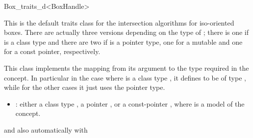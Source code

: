 
\begin{ccRefClass}{Box_traits_d<BoxHandle>}

\ccDefinition

This is the default traits class for the intersection algorithms for
iso-oriented boxes. There are actually three versions depending on the
type of ; there is one if  is a class type and there are
two if  is a pointer type, one for a mutable and one for a const
pointer, respectively.

This class implements the mapping from its  argument to
the  type required in the
 concept. In particular in the case where
 is a class type , it defines
 to be of type , while for the other
cases it just uses the pointer type.

\begin{itemize}
  \item
    : either a class type , a pointer , or a
    const-pointer , where  is a model of the
     concept.
\end{itemize}

and also automatically with\\

\ccIsModel


\ccCreation
{}


\ccSeeAlso

\\
\\

\\

\end{ccRefClass}
